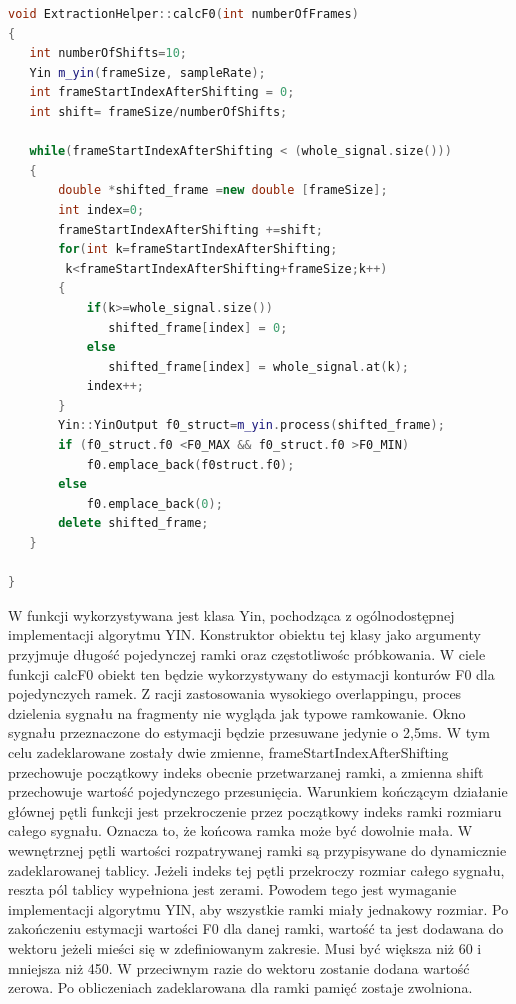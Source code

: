 \documentclass[a4paper,12 pt]{report}
\begin{document}
\FloatBarrier
\newpage
\begin{lstlisting}[caption={Przedstawienie sposobu dokonywania podziału na ramki, wraz z zastosowaniem overlappingu},label={lst:label},language=C++]
void ExtractionHelper::calcF0(int numberOfFrames)
{
   int numberOfShifts=10;
   Yin m_yin(frameSize, sampleRate);
   int frameStartIndexAfterShifting = 0;
   int shift= frameSize/numberOfShifts;

   while(frameStartIndexAfterShifting < (whole_signal.size()))
   {
       double *shifted_frame =new double [frameSize];
       int index=0;
       frameStartIndexAfterShifting +=shift;
       for(int k=frameStartIndexAfterShifting;
		k<frameStartIndexAfterShifting+frameSize;k++)
       {
           if(k>=whole_signal.size())
              shifted_frame[index] = 0;
           else
              shifted_frame[index] = whole_signal.at(k);
           index++;
       }
       Yin::YinOutput f0_struct=m_yin.process(shifted_frame);
       if (f0_struct.f0 <F0_MAX && f0_struct.f0 >F0_MIN)
           f0.emplace_back(f0struct.f0);
       else
           f0.emplace_back(0);
       delete shifted_frame;
   }

}
\end{lstlisting}
W funkcji wykorzystywana jest klasa Yin, pochodząca z ogólnodostępnej implementacji algorytmu YIN. Konstruktor obiektu tej klasy jako argumenty przyjmuje długość pojedynczej ramki oraz częstotliwośc próbkowania.
W ciele funkcji calcF0 obiekt ten będzie wykorzystywany do estymacji konturów F0 dla pojedynczych ramek. 
Z racji zastosowania wysokiego overlappingu, proces dzielenia sygnału na fragmenty nie wygląda jak typowe ramkowanie. Okno sygnału przeznaczone do estymacji będzie przesuwane jedynie o 2,5ms.
W tym celu zadeklarowane zostały dwie zmienne, frameStartIndexAfterShifting przechowuje początkowy indeks obecnie przetwarzanej ramki, a zmienna shift przechowuje wartość pojedynczego przesunięcia.
Warunkiem kończącym działanie głównej pętli funkcji jest przekroczenie przez początkowy indeks ramki rozmiaru całego sygnału. Oznacza to, że końcowa ramka może być dowolnie mała.
W wewnętrznej pętli wartości rozpatrywanej ramki są przypisywane do dynamicznie zadeklarowanej tablicy. Jeżeli indeks tej pętli przekroczy rozmiar całego sygnału, reszta pól tablicy wypełniona jest zerami. Powodem tego jest wymaganie implementacji algorytmu YIN, aby wszystkie ramki miały jednakowy rozmiar.
Po zakończeniu estymacji wartości F0 dla danej ramki, wartość ta jest dodawana do wektoru jeżeli mieści się w zdefiniowanym zakresie. Musi być większa niż 60 i mniejsza niż 450. W przeciwnym razie do wektoru zostanie dodana wartość zerowa. Po obliczeniach zadeklarowana dla ramki pamięć zostaje zwolniona.
\end{document}
